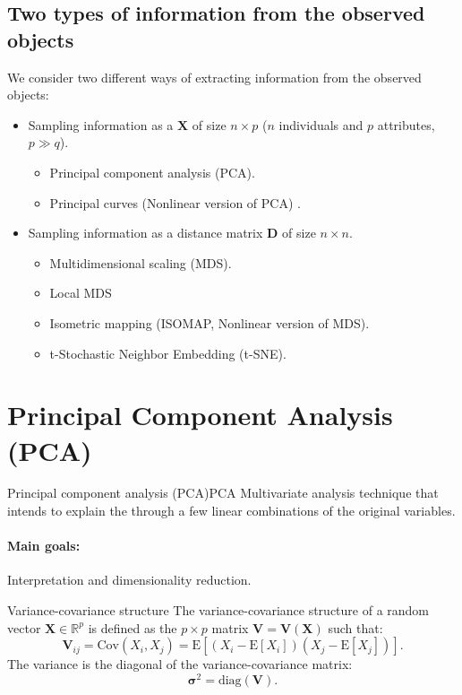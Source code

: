 \subsection{Two types of information from the observed objects}
We consider two different ways of extracting information from the observed objects:
\begin{itemize}
	\item Sampling information as a  $\boldsymbol{X}$ of
	      size $n \times p$ ($n$ individuals and $p$ attributes, $p \gg q$).
	      \begin{itemize}
		      \item Principal component analysis (PCA).
		      \item Principal curves (Nonlinear version of PCA) \cite{hastie_principal_1989,delicado_another_2001}.
	      \end{itemize}
	\item Sampling information as a distance matrix $\boldsymbol{D}$ of size
	      $n \times n$.
	      \begin{itemize}
		      \item Multidimensional scaling (MDS).
		      \item Local MDS
		      \item Isometric mapping (ISOMAP, Nonlinear version of MDS).
		      \item t-Stochastic Neighbor Embedding (t-SNE).
	      \end{itemize}
\end{itemize}

\section[Principal Component Analysis]{Principal Component Analysis (PCA)}

\begin{definition}{Principal component analysis (PCA)}{PCA}
	Multivariate analysis technique that intends to explain the
	 through a few linear combinations of the original
	variables.

	\paragraph{Main goals:} Interpretation and dimensionality reduction.
\end{definition}

\begin{definition}{Variance-covariance structure}{}
	The variance-covariance structure of a random vector $\boldsymbol{X} \in \mathbb{R}^p$
	is defined as the $p \times p$ matrix $\boldsymbol{V} = \boldsymbol{V}(\boldsymbol{X})$
	such that:
	\begin{equation*}
		\boldsymbol{V}_{ij} = \mathrm{Cov}(X_i,X_j) = \mathrm{E}[(X_i - \mathrm{E}[X_i])(X_j - \mathrm{E}[X_j])].
	\end{equation*}
	\tcblower
	The variance is the diagonal of the variance-covariance matrix:
	\begin{equation*}
		\boldsymbol{\sigma}^2 = \mathrm{diag}(\boldsymbol{V}).
	\end{equation*}
\end{definition}

